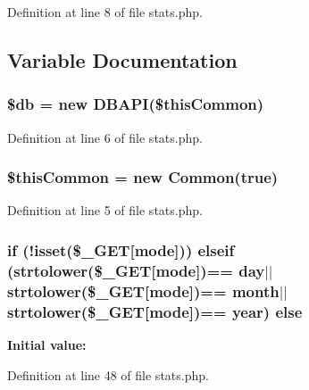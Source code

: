 Definition at line 8 of file stats.\+php.



\subsection{Variable Documentation}
\subsubsection[{\$db}]{\setlength{\rightskip}{0pt plus 5cm}\$db = new {\bf D\+B\+A\+PI}(\$this\+Common)}\label{stats_8php_a1fa3127fc82f96b1436d871ef02be319}


Definition at line 6 of file stats.\+php.

\subsubsection[{\$this\+Common}]{\setlength{\rightskip}{0pt plus 5cm}\$this\+Common = new {\bf Common}(true)}\label{stats_8php_a2dc37683cec5a169d791007363950944}


Definition at line 5 of file stats.\+php.

\subsubsection[{else}]{\setlength{\rightskip}{0pt plus 5cm}if (!isset(\$\+\_\+\+G\+ET[\textquotesingle{}mode\textquotesingle{}])) elseif (strtolower(\$\+\_\+\+G\+ET[\textquotesingle{}mode\textquotesingle{}])== \textquotesingle{}day\textquotesingle{}$\vert$$\vert$strtolower(\$\+\_\+\+G\+ET[\textquotesingle{}mode\textquotesingle{}])== \textquotesingle{}month\textquotesingle{}$\vert$$\vert$strtolower(\$\+\_\+\+G\+ET[\textquotesingle{}mode\textquotesingle{}])== \textquotesingle{}year\textquotesingle{}) else}\label{stats_8php_aa98e5745136db21835880938c0eba666}
{\bfseries Initial value\+:}


Definition at line 48 of file stats.\+php.

